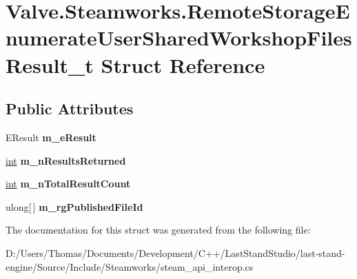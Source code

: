 \hypertarget{structValve_1_1Steamworks_1_1RemoteStorageEnumerateUserSharedWorkshopFilesResult__t}{}\section{Valve.\+Steamworks.\+Remote\+Storage\+Enumerate\+User\+Shared\+Workshop\+Files\+Result\+\_\+t Struct Reference}
\label{structValve_1_1Steamworks_1_1RemoteStorageEnumerateUserSharedWorkshopFilesResult__t}
\subsection*{Public Attributes}
\begin{DoxyCompactItemize}
\item 
\hypertarget{structValve_1_1Steamworks_1_1RemoteStorageEnumerateUserSharedWorkshopFilesResult__t_a04d2c2d909b6725e450260232f6789af}{}E\+Result {\bfseries m\+\_\+e\+Result}\label{structValve_1_1Steamworks_1_1RemoteStorageEnumerateUserSharedWorkshopFilesResult__t_a04d2c2d909b6725e450260232f6789af}

\item 
\hypertarget{structValve_1_1Steamworks_1_1RemoteStorageEnumerateUserSharedWorkshopFilesResult__t_a4134156b6bd84b2f69c94328160af32e}{}\hyperlink{SDL__thread_8h_a6a64f9be4433e4de6e2f2f548cf3c08e}{int} {\bfseries m\+\_\+n\+Results\+Returned}\label{structValve_1_1Steamworks_1_1RemoteStorageEnumerateUserSharedWorkshopFilesResult__t_a4134156b6bd84b2f69c94328160af32e}

\item 
\hypertarget{structValve_1_1Steamworks_1_1RemoteStorageEnumerateUserSharedWorkshopFilesResult__t_ae63a7f4dbf75fde3d9a82003c2cbaf67}{}\hyperlink{SDL__thread_8h_a6a64f9be4433e4de6e2f2f548cf3c08e}{int} {\bfseries m\+\_\+n\+Total\+Result\+Count}\label{structValve_1_1Steamworks_1_1RemoteStorageEnumerateUserSharedWorkshopFilesResult__t_ae63a7f4dbf75fde3d9a82003c2cbaf67}

\item 
\hypertarget{structValve_1_1Steamworks_1_1RemoteStorageEnumerateUserSharedWorkshopFilesResult__t_a604e5b4eb0973fa598f5d80b4a03864a}{}ulong\mbox{[}$\,$\mbox{]} {\bfseries m\+\_\+rg\+Published\+File\+Id}\label{structValve_1_1Steamworks_1_1RemoteStorageEnumerateUserSharedWorkshopFilesResult__t_a604e5b4eb0973fa598f5d80b4a03864a}

\end{DoxyCompactItemize}


The documentation for this struct was generated from the following file\+:\begin{DoxyCompactItemize}
\item 
D\+:/\+Users/\+Thomas/\+Documents/\+Development/\+C++/\+Last\+Stand\+Studio/last-\/stand-\/engine/\+Source/\+Include/\+Steamworks/steam\+\_\+api\+\_\+interop.\+cs\end{DoxyCompactItemize}
